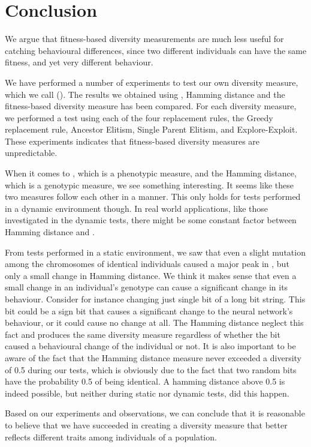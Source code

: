 \section{Conclusion}\label{sec:conclusion}
We argue that fitness-based diversity measurements are much less useful for catching behavioural differences, since two different individuals can have the same fitness, and yet very different behaviour.

We have performed a number of experiments to test our own diversity measure, which we call \di{} (\dia{}).
The results we obtained using \dia{}, Hamming distance and the fitness-based diversity measure has been compared.
For each diversity measure, we performed a test using each of the four replacement rules, the Greedy replacement rule, Ancestor Elitism, Single Parent Elitism, and Explore-Exploit.
These experiments indicates that fitness-based diversity measures are unpredictable.

When it comes to \dia{}, which is a phenotypic measure, and the Hamming distance, which is a genotypic measure, we see something interesting. It seems like these two measures follow each other in a manner.
This only holds for tests performed in a dynamic environment though. 
In real world applications, like those investigated in the dynamic tests, there might be some constant factor between Hamming distance and \dia{}.

From tests performed in a static environment, we saw that even a slight mutation among the chromosomes of identical individuals caused a major peak in \dia{}, but only a small change in Hamming distance.
We think it makes sense that even a small change in an individual's genotype can cause a significant change in its behaviour. Consider for instance changing just single bit of a long bit string. This bit could be a sign bit that causes a significant change to the neural network's behaviour, or it could cause no change at all.
The Hamming distance neglect this fact and produces the same diversity measure regardless of whether the bit caused a behavioural change of the individual or not.
It is also important to be aware of the fact that the Hamming distance measure never exceeded a diversity of \num{0.5} during our tests, which is obviously due to the fact that two random bits have the probability \num{0.5} of being identical.
A hamming distance above \num{0.5} is indeed possible, but neither during static nor dynamic tests, did this happen. 

Based on our experiments and observations, we can conclude that it is reasonable to believe that we have succeeded in creating a diversity measure that better reflects different traits among individuals of a population.

